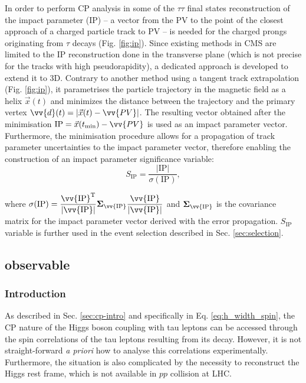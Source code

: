 In order to perform CP analysis in some of the $\tau\tau$ final states reconstruction of the impact parameter (IP) -- a vector from the PV to the point of the closest approach of a charged particle track to PV -- is needed for the charged prongs originating from $\tau$ decays  (Fig. \ref{fig:ip}). Since existing methods in CMS are limited to the IP reconstruction done in the transverse plane (which is not precise for the tracks with high pseudorapidity), a dedicated approach is developed to extend it to 3D. Contrary to another method using a tangent track extrapolation (Fig. \ref{fig:ip}), it parametrises the particle trajectory in the magnetic field as a helix $\vec{x}(t)$ and minimizes the distance between the trajectory and the primary vertex $\vv{d}(t) = |\vec{x}(t) - \vv{PV}|$. The resulting vector obtained after the minimisation $\text{IP} = \vec{x}(t_{\text{min}}) - \vv{PV}$ is used as an impact parameter vector. Furthermore, the minimisation procedure allows for a propagation of track parameter uncertainties to the impact parameter vector, therefore enabling the construction of an impact parameter significance variable:
\begin{equation}
S_{\text{IP}} = \dfrac{|\text{IP}|}{\sigma(\text{IP})},
\end{equation}

where $\sigma(\text{IP}) = \dfrac{\vv{\text{IP}}^{\text{T}}}{|\vv{\text{IP}}|}\boldsymbol{\Sigma}_{\vv{\text{IP}}}\dfrac{\vv{\text{IP}}}{|\vv{\text{IP}}|}$ and $\boldsymbol{\Sigma}_{\vv{\text{IP}}}$ is the covariance matrix for the impact parameter vector derived with the error propagation. $S_{\text{IP}}$ variable is further used in the event selection described in Sec. \ref{sec:selection}.

\subsection{\phicp observable}\label{sec:phicp}
\subsubsection{Introduction}
As described in Sec. \ref{sec:cp-intro} and specifically in Eq. \ref{eq:h_width_spin}, the CP nature of the Higgs boson coupling with tau leptons can be accessed through the spin correlations of the tau leptons resulting from its decay. However, it is not straight-forward \textit{a priori} how to analyse this correlations experimentally. Furthermore, the situation is also complicated by the necessity to reconstruct the Higgs rest frame, which is not available in $pp$ collision at LHC. 

